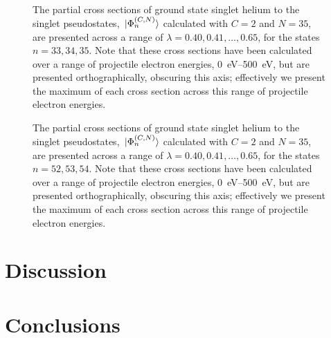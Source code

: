 \documentclass[]{article}
\begin{document}
\begin{figure}[h]
  \begin{center}
    
  \end{center}
  \caption[Partial Cross Sections: Auto-Ionising II]{
    The partial cross sections of ground state singlet helium to the singlet
    pseudostates, $\ket*{\Phi_{n}^{(C, N)}}$ calculated with $C = 2$ and
    $N = 35$, are presented across a range of
    $\lambda = 0.40, 0.41, \dotsc, 0.65$, for the states $n = 33, 34, 35$.
    Note that these cross sections have been calculated over a range of
    projectile electron energies, \SIrange{0}{500}{\eV}, but are presented
    orthographically, obscuring this axis; effectively we present the maximum of
    each cross section across this range of projectile electron energies.
  }
  \label{fig:pcs_34}
\end{figure}

\begin{figure}[h]
  \begin{center}
    
  \end{center}
  \caption[Partial Cross Sections: Auto-Ionising III]{
    The partial cross sections of ground state singlet helium to the singlet
    pseudostates, $\ket*{\Phi_{n}^{(C, N)}}$ calculated with $C = 2$ and
    $N = 35$, are presented across a range of
    $\lambda = 0.40, 0.41, \dotsc, 0.65$, for the states $n = 52, 53, 54$.
    Note that these cross sections have been calculated over a range of
    projectile electron energies, \SIrange{0}{500}{\eV}, but are presented
    orthographically, obscuring this axis; effectively we present the maximum of
    each cross section across this range of projectile electron energies.
  }
  \label{fig:pcs_53}
\end{figure}

\clearpage

\section{Discussion}
\label{sec:dis}


\clearpage

\section{Conclusions}
\label{sec:co}


\clearpage



\clearpage

\listoftodos
\end{document}
